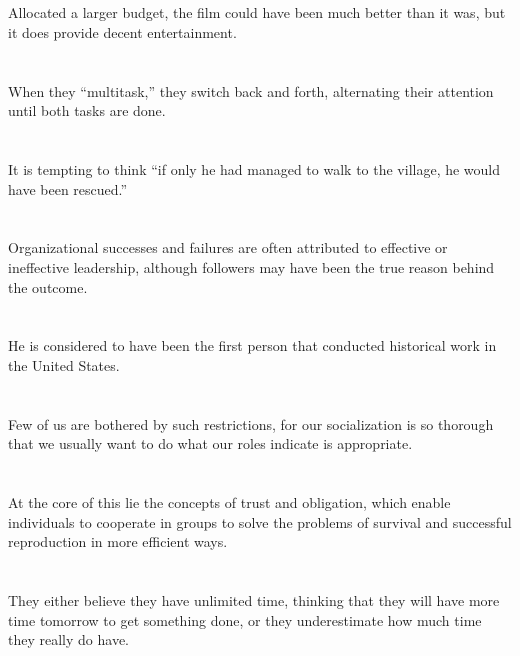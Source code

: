 \documentclass[a4paper, twocolumn]{oblivoir}
\begin{document}
    \section{}
    Allocated a larger budget, the film could have been much better than it was, but it does provide decent entertainment.

    \section{}
    When they “multitask,” they switch back and forth, alternating their attention until both tasks are done.

    \section{}
    It is tempting to think ``if only he had managed to walk to the village, he would have been rescued.''

    \section{}
    Organizational successes and failures are often attributed to effective or ineffective leadership, although followers may have been the true reason behind the outcome.
    
    \section{}
    He is considered to have been the first person that conducted historical work in the United States.

    \section{}
    Few of us are bothered by such restrictions, for our socialization is so thorough that we usually want to do what our roles indicate is appropriate.

    \section{}
    At the core of this lie the concepts of trust and obligation, which enable individuals to cooperate in groups to solve the problems of survival and successful reproduction in more efficient ways.
    \pagebreak
    \section{}
    They either believe they have unlimited time, thinking that they will have more time tomorrow to get something done, or they underestimate how much time they really do have.
\end{document}
